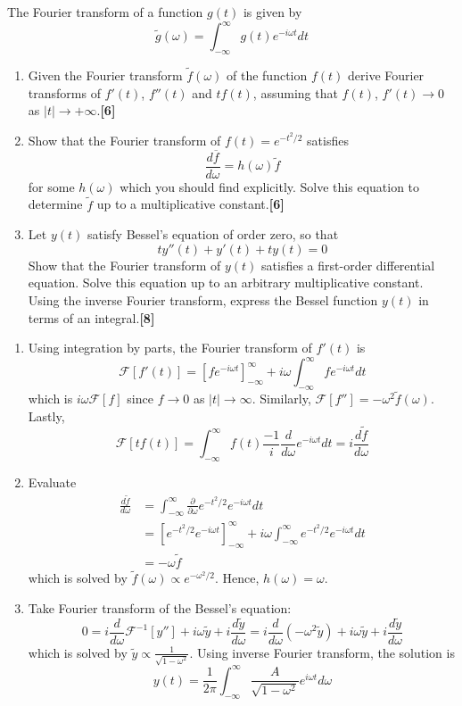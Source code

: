 \documentclass[a4paper]{article}
\begin{document}
\begin{qns}
The Fourier transform of a function $g(t)$ is given by
$$\tilde{g}(\omega)=\int_{-\infty}^\infty g(t)e^{-i\omega t}dt$$
\begin{enumerate}[label=(\alph*)]
\item Given the Fourier transform $\tilde{f}(\omega)$ of the function $f(t)$ derive Fourier transforms of $f'(t)$, $f''(t)$ and $tf(t)$, assuming that $f(t)$, $f'(t)\rightarrow 0$ as $|t|\rightarrow+\infty$.\hfill\textbf{[6]}
\item Show that the Fourier transform of $f(t)=e^{-t^2/2}$ satisfies
$$\frac{d\overline{f}}{d\omega}=h(\omega)\tilde{f}$$
for some $h(\omega)$ which you should find explicitly. Solve this equation to determine $\tilde{f}$ up to a multiplicative constant.\hfill\textbf{[6]}
\item Let $y(t)$ satisfy Bessel’s equation of order zero, so that
$$ty''(t)+y'(t)+ty(t)=0$$
Show that the Fourier transform of $y(t)$ satisfies a first-order differential equation. Solve this equation up to an arbitrary multiplicative constant. Using the inverse Fourier transform, express the Bessel function $y(t)$ in terms of an integral.\hfill\textbf{[8]}
\end{enumerate}
\end{qns}
\begin{ans}\leavevmode
\begin{enumerate}[label=(\alph*)]
\item Using integration by parts, the Fourier transform of $f'(t)$ is
$$\mathcal{F}[f'(t)]=[fe^{-i\omega t}]_{-\infty}^\infty+i\omega\int_{-\infty}^\infty fe^{-i\omega t}dt$$
which is $i\omega\mathcal{F}[f]$ since $f\rightarrow 0$ as $|t|\rightarrow\infty$. Similarly, $\mathcal{F}[f'']=-\omega^2\tilde{f}(\omega)$. Lastly,
$$\mathcal{F}[tf(t)]=\int_{-\infty}^\infty f(t)\frac{-1}{i}\frac{d}{d\omega}e^{-i\omega t}dt=i\frac{d\tilde{f}}{d\omega}$$
\item Evaluate
\begin{align}
    \frac{d\tilde{f}}{d\omega}&=\int_{-\infty}^\infty\frac{\partial}{\partial\omega}e^{-t^2/2}e^{-i\omega t}dt\nonumber\\&=[e^{-t^2/2}e^{-i\omega t}]_{-\infty}^\infty +i\omega\int_{-\infty}^\infty e^{-t^2/2}e^{-i\omega t}dt\nonumber\\&=-\omega\tilde{f}\nonumber
\end{align}
which is solved by $\tilde{f}(\omega)\propto e^{-\omega^2/2}$. Hence, $h(\omega)=\omega$.
\item Take Fourier transform of the Bessel's equation:
$$0=i\frac{d}{d\omega}\mathcal{F}^{-1}[y'']+i\omega\tilde{y}+i\frac{d\tilde{y}}{d\omega}=i\frac{d}{d\omega}(-\omega^2\tilde{y})+i\omega\tilde{y}+i\frac{d\tilde{y}}{d\omega}$$
which is solved by $\tilde{y}\propto\frac{1}{\sqrt{1-\omega^2}}$. Using inverse Fourier transform, the solution is
$$y(t)=\frac{1}{2\pi}\int_{-\infty}^\infty\frac{A}{\sqrt{1-\omega^2}}e^{i\omega t}d\omega$$
\end{enumerate}
\end{ans}
\end{document}
